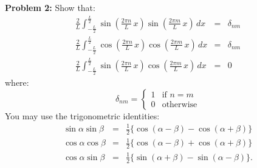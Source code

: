 \documentclass[12pt]{article}
\begin{document}
\vskip 1cm
\noindent
{\bf Problem 2:}  Show that:
\begin{eqnarray}
\frac{2}{L} \int_{-\frac{L}{2}}^{\frac{L}{2}} 
\sin\left(\frac{2\pi n}{L} \, x \right) \sin\left(\frac{2\pi m}{L} \, x \right) \, dx &=& \delta_{nm} \label{eqn:trigortha} \\
 \frac{2}{L} \int_{-\frac{L}{2}}^{\frac{L}{2}} 
\cos\left(\frac{2\pi n}{L} \, x \right) \cos\left(\frac{2\pi m}{L} \, x \right) \, dx &=& \delta_{nm} \label{eqn:trigorthb}\\
\frac{2}{L} \int_{-\frac{L}{2}}^{\frac{L}{2}} 
\sin\left(\frac{2\pi n}{L} \, x \right) \cos\left(\frac{2\pi m}{L} \, x \right) \, dx &=& 0 \label{eqn:trigorthc}
\end{eqnarray}
where:
\begin{displaymath}
\delta_{nm} =  
\left\{
        \begin{array}{ll}
                1  & \mbox{if } n=m \\
                0 & \mbox{otherwise}
        \end{array}
\right.
\end{displaymath}
You may use the trigonometric identities:
\begin{eqnarray*}
\sin \alpha \sin \beta &=& \frac{1}{2} \{\cos(\alpha - \beta) - \cos(\alpha + \beta)\}\\
\cos \alpha \cos \beta &=& \frac{1}{2} \{\cos(\alpha - \beta) + \cos(\alpha + \beta)\}\\
\cos \alpha \sin \beta &=& \frac{1}{2} \{\sin(\alpha + \beta) - \sin(\alpha - \beta)\}.\\
\end{eqnarray*}
\end{document}
